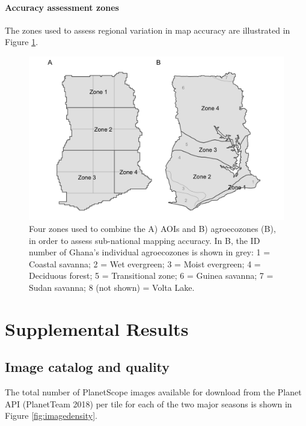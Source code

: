 \documentclass[
  11pt,
  a4paper]{article}
\begin{document}
\hypertarget{accuracy-assessment-zones}{%
\paragraph{Accuracy assessment zones}\label{accuracy-assessment-zones}}

The zones used to assess regional variation in map accuracy are
illustrated in Figure \ref{fig:aoizones}.

\begin{figure}[!ht]

{\centering \includegraphics[width=0.9\linewidth,]{figures/si_aoi_zones} 

}

\caption{Four zones used to combine the A) AOIs and B) agroecozones (B), in order to assess sub-national mapping accuracy. In B, the ID number of Ghana's individual agroecozones is shown in grey: 1 = Coastal savanna; 2 = Wet evergreen; 3 = Moist evergreen; 4 = Deciduous forest; 5 = Transitional zone; 6 = Guinea savanna; 7 = Sudan savanna; 8 (not shown) = Volta Lake.}\label{fig:aoizones}
\end{figure}

\hypertarget{supplemental-results}{%
\section{Supplemental Results}\label{supplemental-results}}

\hypertarget{image-catalog-and-quality}{%
\subsection{Image catalog and quality}\label{image-catalog-and-quality}}

The total number of PlanetScope images available for download from the
Planet API (PlanetTeam 2018) per tile for each of the two major seasons
is shown in Figure \ref{fig:imagedensity}.
\end{document}
